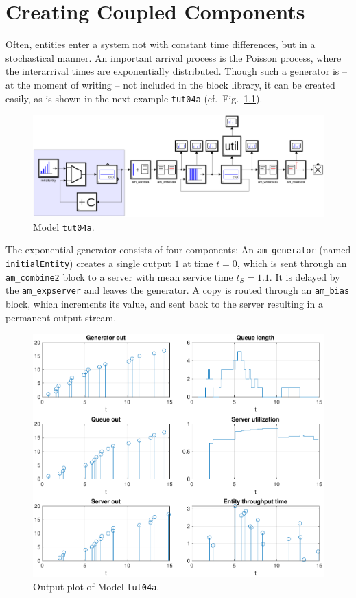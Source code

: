 \documentclass[12pt,oneside,a4paper,bibtotoc,BCOR=0pt,DIV=20]{scrreprt}
\newcommand{\cft}[1]{\mbox{\texttt{#1}}}   %
\begin{document}
\chapter{Creating Coupled Components} \label{sec6}

Often, entities enter a system not with constant time differences, but in a
stochastical manner. An important arrival process is the Poisson process, where
the interarrival times are exponentially distributed. Though such a generator
is -- at the moment of writing -- not included in the block library, it can be
created easily, as is shown in the next example \cft{tut04a}
(cf.\ Fig.\ \ref{fig_8}).

\begin{figure}[ht]
\centering
\includegraphics[width=0.99\columnwidth]{images/bild08.pdf}
\caption{Model \cft{tut04a}.}
\label{fig_8}
\end{figure}

The exponential generator consists of four components: An \cft{am\_generator}
(named \cft{initialEntity}) creates a single output $1$ at time $t = 0$, which
is sent through an \cft{am\_combine2} block to a server with mean service time
$t_S = 1.1$. It is delayed by the \cft{am\_expserver} and leaves the
generator. A copy is routed through an \cft{am\_bias} block, which increments
its value, and sent back to the server resulting in a permanent output stream.

\begin{figure}[ht]
\centering
\includegraphics[width=0.50\columnwidth]{images/bild09.pdf}
\caption{Output plot of Model \cft{tut04a}.}
\label{fig_9}
\end{figure}
\end{document}
